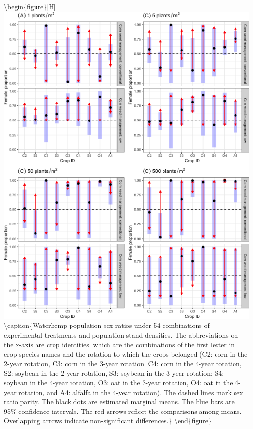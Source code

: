 \documentclass[
]{article}
\begin{document}
\textbackslash begin\{figure\}{[}H{]}
\includegraphics[width=1\linewidth]{Manuscript_whole_files/figure-latex/sexr18-dens-arrow-1} \textbackslash caption\{Waterhemp population sex ratios under 54 combinations of experimental treatments and population stand densities. The abbreviations on the x-axis are crop identities, which are the combinations of the first letter in crop species names and the rotation to which the crops belonged (C2: corn in the 2-year rotation, C3: corn in the 3-year rotation, C4: corn in the 4-year rotation, S2: soybean in the 2-year rotation, S3: soybean in the 3-year rotation; S4: soybean in the 4-year rotation, O3: oat in the 3-year rotation, O4: oat in the 4-year rotation, and A4: alfalfa in the 4-year rotation). The dashed lines mark sex ratio parity. The black dots are estimated marginal means. The blue bars are 95\% confidence intervals. The red arrows reflect the comparisons among means. Overlapping arrows indicate non-significant differences.\}\label{fig:sexr18-dens-arrow}
\textbackslash end\{figure\}
\end{document}
